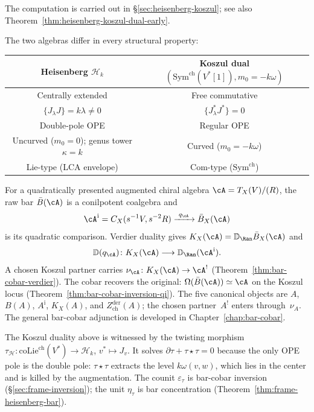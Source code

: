 The computation is carried out in \S\ref{sec:heisenberg-koszul}; see also Theorem~\ref{thm:heisenberg-koszul-dual-early}.

The two algebras differ in every structural property:
\begin{center}
\small
\begin{tabular}{c|c}
\textbf{Heisenberg} $\mathcal{H}_k$ &
\textbf{Koszul dual} $(\mathrm{Sym}^{\mathrm{ch}}(V^*[1]),m_0=-k\omega)$ \\
\hline
Centrally extended & Free commutative \\
$\{J_\lambda J\} = k\lambda \neq 0$ &
$\{J^*_\lambda J^*\} = 0$ \\
Double-pole OPE & Regular OPE \\
Uncurved ($m_0 = 0$); genus tower $\kappa = k$ & Curved ($m_0 = -k\omega$) \\
Lie-type (LCA envelope) & Com-type ($\mathrm{Sym}^{\mathrm{ch}}$)
\end{tabular}
\end{center}

For a quadratically presented augmented chiral algebra
$\cA=T_X(V)/(R)$, the raw bar $\bar{B}(\cA)$ is a conilpotent
coalgebra and
\[
\cA^{\mathrm i}=C_X(s^{-1}V,s^{-2}R)
\xrightarrow{\ q_\cA\ }\bar B_X(\cA)
\]
is its quadratic comparison. Verdier duality gives
$K_X(\cA)=\mathbb D_{\Ran}\bar B_X(\cA)$ and
\[
\mathbb D(q_\cA)\colon K_X(\cA)\longrightarrow
\mathbb D_{\Ran}(\cA^{\mathrm i}).
\]
A chosen Koszul partner carries
$\nu_\cA\colon K_X(\cA)\to\cA^!$
(Theorem~\ref{thm:bar-cobar-verdier}). The cobar recovers the original:
$\Omega(\bar{B}(\cA)) \simeq \cA$ on the Koszul locus
(Theorem~\ref{thm:bar-cobar-inversion-qi}). The five canonical
objects are $A$, $B(A)$, $A^{\mathrm i}$, $K_X(A)$, and
$Z^{\mathrm{der}}_{\mathrm{ch}}(A)$; the chosen partner~$A^!$ enters
through~$\nu_A$. The general bar-cobar adjunction is developed in
Chapter~\ref{chap:bar-cobar}.

\begin{remark}
\label{rem:frame-twisting-morphism}
The Koszul duality above is witnessed by the twisting morphism
$\tau_{\mathcal{H}} \colon \mathrm{coLie}^{\mathrm{ch}}(V^*)
\to \mathcal{H}_k$,
$v^* \mapsto J_v$.
It solves $\partial\tau + \tau \star \tau = 0$
because the only OPE pole is the double pole:
$\tau \star \tau$ extracts the level $k\omega(v,w)$,
which lies in the center and is killed by the augmentation.
The counit $\varepsilon_\tau$ is bar-cobar inversion
(\S\ref{sec:frame-inversion}); the unit $\eta_\tau$ is
bar concentration (Theorem~\ref{thm:frame-heisenberg-bar}).
\end{remark}

